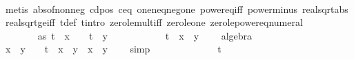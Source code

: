 \begin{isabellebody}
\ \ \ \ \isamarkupfalse%
\ {\isacharparenleft}metis\ abs{\isacharunderscore}of{\isacharunderscore}nonneg\ c{\isacharunderscore}d{\isacharunderscore}pos\ c{\isacharunderscore}eq{\isacharunderscore}{}\ one{\isacharunderscore}neq{\isacharunderscore}neg{\isacharunderscore}one\ power{}{\isacharunderscore}eq{\isacharunderscore}{}{\isacharunderscore}iff\ power{}{\isacharunderscore}minus\ real{\isacharunderscore}sqrt{\isacharunderscore}abs\ real{\isacharunderscore}sqrt{\isacharunderscore}ge{\isacharunderscore}{}{\isacharunderscore}iff\ t{\isacharunderscore}def\ t{\isacharunderscore}intro\ zero{\isacharunderscore}le{\isacharunderscore}mult{\isacharunderscore}iff\ zero{\isacharunderscore}le{\isacharunderscore}one\ zero{\isacharunderscore}le{\isacharunderscore}power{\isacharunderscore}eq{\isacharunderscore}numeral{\isacharparenright}\isanewline
\ \ \ \ \isamarkupfalse%
\ {\isacharminus}\isanewline
\ \ \ \ \ \ \isamarkupfalse%
\ as{\isacharcolon}\ {\isachardoublequoteopen}t\ {\isacharasterisk}\ x\ {\isacharequal}\ {}\ {\isasymand}\ t\ {\isacharasterisk}\ y\ {\isacharequal}\ {}{\isachardoublequoteclose}\isanewline
\ \ \ \ \ \ \isamarkupfalse%
\ \isamarkupfalse%
\ {\isachardoublequoteopen}t\ {\isacharasterisk}\ x\ {\isacharasterisk}\ y\ {\isacharequal}\ {}{\isachardoublequoteclose}\ \isamarkupfalse%
\ algebra\isanewline
\ \ \ \ \ \ \isamarkupfalse%
\ \isamarkupfalse%
\ {\isachardoublequoteopen}x\ {\isacharplus}\ y\ {\isacharminus}\ {}\ {\isacharminus}\ t\ {\isacharasterisk}\ x\ {\isacharasterisk}\ y\ {\isacharequal}\ x\ {\isacharplus}\ y\ {\isacharminus}\ {}{\isachardoublequoteclose}\ \isamarkupfalse%
\ simp\isanewline
\ \ \ \ \ \ \isamarkupfalse%
\ \isamarkupfalse%
\ {\isachardoublequoteopen}{\isachardot}{\isachardot}{\isachardot}\ {\isacharequal}\ {}\ {\isacharslash}\ t\ {\isacharminus}\ {}{\isachardoublequoteclose}\ \isanewline
\ \ \ \ \ \ \isamarkupfalse%
\ {\isacharminus}\isanewline
\ \ \ \ \ \ \ \ \isamarkupfalse%

\end{isabellebody}

